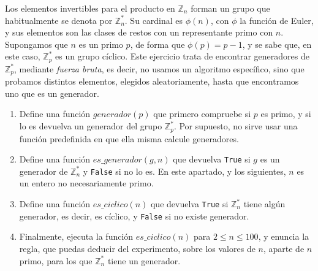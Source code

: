 \begin{ejer}
	
	Los elementos invertibles para el producto en $\mathbb{Z}_n$ forman un grupo  que habitualmente se denota por $\mathbb{Z}_n^*$. Su cardinal es $\phi(n)$, con $\phi$ la función de Euler, y sus elementos son las clases de restos con un representante primo con $n$. Supongamos que $n$ es un primo $p$, de forma que  $\phi(p)=p-1$, y se sabe que, en este caso,  $\mathbb{Z}_p^*$ es un grupo cíclico. Este ejercicio trata de encontrar generadores de $\mathbb{Z}_p^*$, mediante {\itshape fuerza bruta}, es decir, no usamos un algoritmo específico, sino que probamos distintos elementos, elegidos aleatoriamente, hasta que encontramos uno que es un generador.
	
	\begin{enumerate}
	\item Define una función $generador(p)$ que primero compruebe si $p$ es primo, y si lo es devuelva un generador del grupo $\mathbb{Z}_p^*$. Por supuesto, no sirve usar una función predefinida en {\sage}  que ella misma calcule generadores. 
	
\item  Define una función $es\_generador(g,n)$ que devuelva \lstinline|True| si $g$ es un generador de $\mathbb{Z}_n^*$ y \lstinline|False| si no lo es. En este apartado,  y los siguientes, $n$ es un entero no necesariamente primo. 
	
	\item Define una función $es\_ciclico(n)$ que devuelva  \lstinline|True| si $\mathbb{Z}_n^*$ tiene algún generador, es decir, es cíclico, y \lstinline|False| si no existe generador. 
	
	\item Finalmente, ejecuta la función  $es\_ciclico(n)$ para $2\le n\le 100$, y enuncia la regla,  que puedas deducir del experimento,  sobre los valores de $n$, aparte de $n$ primo, para los que  $\mathbb{Z}_n^*$ tiene un generador.
	
\end{enumerate}	
	\end{ejer}


